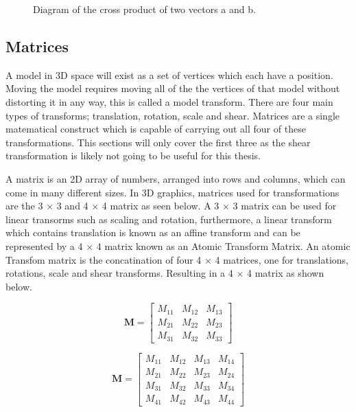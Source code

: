 \begin{figure}[htbp]
	{\centering
		\setlength{\fboxrule}{1pt}
		\vspace{7px}
		\caption{Diagram of the cross product of two vectors a and b.}
	}
\end{figure}
\FloatBarrier

\subsection{Matrices}

A model in 3D space will exist as a set of vertices which each have a position. Moving the model requires moving all of the the vertices of that model without distorting it in any way, this is called a model transform. There are four main types of transforms; translation, rotation, scale and shear. Matrices are a single matematical construct which is capable of carrying out all four of these transformations. This sections will only cover the first three as the shear transformation is likely not going to be useful for this thesis.    

A matrix is an 2D array of numbers, arranged into rows and columns, which can come in many different sizes. In 3D graphics, matrices used for transformations are the 3 $\times$ 3 and 4 $\times$ 4 matrix as seen below. A 3 $\times$ 3 matrix can be used for linear transorms such as scaling and rotation, furthermore, a linear transform which contains translation is known as an affine transform and can be represented by a 4 $\times$ 4 matrix known as an Atomic Transform Matrix. An atomic Transfom matrix is the concatination of four 4 $\times$ 4 matrices, one for translations, rotations, scale and shear transforms. Resulting in a 4 $\times$ 4 matrix as shown below. 

\begin{equation}
\textbf{M} = \begin{bmatrix}
M_{11} & M_{12} & M_{13} \\
M_{21} & M_{22} & M_{23} \\
M_{31} & M_{32} & M_{33}
\end{bmatrix}
\end{equation}

\begin{equation}
\textbf{M} = \begin{bmatrix}
M_{11} & M_{12} & M_{13} & M_{14}\\
M_{21} & M_{22} & M_{23} & M_{24}\\
M_{31} & M_{32} & M_{33} & M_{34}\\
M_{41} & M_{42} & M_{43} & M_{44}
\end{bmatrix}
\end{equation}

